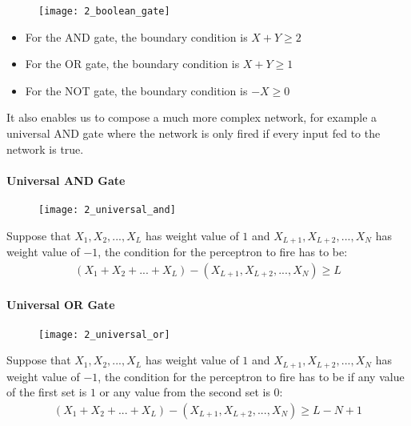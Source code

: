 \begin{figure}[H]
	\centering
	\texttt{[image: 2\_boolean\_gate]}
\end{figure}

\begin{itemize}
	\item For the AND gate, the boundary condition is $X + Y \geq 2$
	\item For the OR gate, the boundary condition is $X + Y \geq 1$
	\item For the NOT gate, the boundary condition is $-X \geq 0$
\end{itemize}

\hfill\break
It also enables us to compose a much more complex network, for example a universal AND gate where the network is only fired if every input fed to the network is true.

\paragraph{Universal AND Gate}

\begin{figure}[H]
	\centering
	\texttt{[image: 2\_universal\_and]}
\end{figure}

Suppose that $X_1,X_2,...,X_L$ has weight value of $1$ and $X_{L+1},X_{L+2},...,X_N$ has weight value of $-1$, the condition for the perceptron to fire has to be:
\begin{align}
	(X_1+X_2+...+X_L) - (X_{L+1},X_{L+2},...,X_N) \geq L
\end{align}

\paragraph{Universal OR Gate}

\begin{figure}[H]
	\centering
	\texttt{[image: 2\_universal\_or]}
\end{figure}

Suppose that $X_1,X_2,...,X_L$ has weight value of $1$ and $X_{L+1},X_{L+2},...,X_N$ has weight value of $-1$, the condition for the perceptron to fire has to be if any value of the first set is $1$ or any value from the second set is $0$:
\begin{align}
	(X_1+X_2+...+X_L) - (X_{L+1},X_{L+2},...,X_N) \geq L - N + 1
\end{align}

